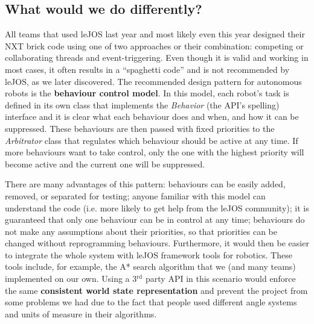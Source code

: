 \subsection{What would we do differently?}
All teams that used leJOS last year and most likely even this year designed their NXT brick code using one of two approaches or their combination: competing or collaborating threads and event-triggering. Even though it is valid and working in most cases, it often results in a ``spaghetti code'' and is not recommended by leJOS, as we later discovered. The recommended design pattern for autonomous robots is the \textbf{behaviour control model}\cite{behaviour}. In this model, each robot's task is defined in its own class that implements the \textsl{Behavior} (the API's spelling) interface and it is clear what each behaviour does and when, and how it can be suppressed. These behaviours are then passed with fixed priorities to the \textsl{Arbitrator} class that regulates which behaviour should be active at any time. If more behaviours want to take control, only the one with the highest priority will become active and the current one will be suppressed.

There are many advantages of this pattern: behaviours can be easily added, removed, or separated for testing; anyone familiar with this model can understand the code (i.e. more likely to get help from the leJOS community); it is guaranteed that only one behaviour can be in control at any time; behaviours do not make any assumptions about their priorities, so that priorities can be changed without reprogramming behaviours. Furthermore, it would then be easier to integrate the whole system with leJOS framework tools for robotics. These tools include, for example, the A* search algorithm that we (and many teams) implemented on our own. Using a 3$^{\textrm{rd}}$ party API in this scenario would enforce the same \textbf{consistent world state representation} and prevent the project from some problems we had due to the fact that people used different angle systems and units of measure in their algorithms.